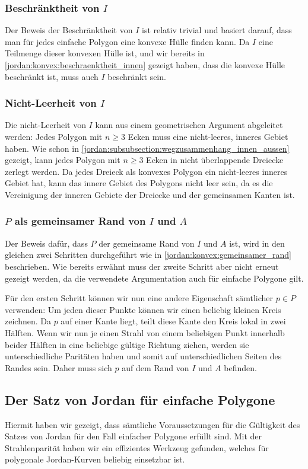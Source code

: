 \subsubsection{Beschränktheit von $I$
\label{jordan:subsubsection:beschraenktheit_innen}}

Der Beweis der Beschränktheit von $I$ ist relativ trivial und basiert darauf, dass man für jedes einfache Polygon eine konvexe Hülle finden kann.
Da $I$ eine Teilmenge dieser konvexen Hülle ist, und wir bereits in \ref{jordan:konvex:beschraenktheit_innen} gezeigt haben, dass die konvexe Hülle beschränkt ist, muss auch $I$ beschränkt sein.

\subsubsection{Nicht-Leerheit von $I$
\label{jordan:subsubsection:nicht_leerheit_innen}}

Die nicht-Leerheit von $I$ kann aus einem geometrischen Argument abgeleitet werden: Jedes Polygon mit $n \geq 3$ Ecken muss eine nicht-leeres, inneres Gebiet haben.
Wie schon in \ref{jordan:subsubsection:wegzusammenhang_innen_aussen} gezeigt, kann jedes Polygon mit $n \geq 3$ Ecken in nicht überlappende Dreiecke zerlegt werden.
Da jedes Dreieck als konvexes Polygon ein nicht-leeres inneres Gebiet hat, kann das innere Gebiet des Polygons nicht leer sein, da es die Vereinigung der inneren Gebiete der Dreiecke und der gemeinsamen Kanten ist.

\subsubsection{$P$ als gemeinsamer Rand von $I$ und $A$
\label{jordan:subsubsection:gemeinsamer_rand_innen_aussen}}

Der Beweis dafür, dass $P$ der gemeinsame Rand von $I$ und $A$ ist, wird in den gleichen zwei Schritten durchgeführt wie in \ref{jordan:konvex:gemeinsamer_rand} beschrieben.
Wie bereits erwähnt muss der zweite Schritt aber nicht erneut gezeigt werden, da die verwendete Argumentation auch für einfache Polygone gilt.

Für den ersten Schritt können wir nun eine andere Eigenschaft sämtlicher $p \in P$ verwenden:
Um jeden dieser Punkte können wir einen beliebig kleinen Kreis zeichnen.
Da $p$ auf einer Kante liegt, teilt diese Kante den Kreis lokal in zwei Hälften.
Wenn wir nun je einen Strahl von einem beliebigen Punkt innerhalb beider Hälften in eine beliebige gültige Richtung ziehen, werden sie unterschiedliche Paritäten haben und somit auf unterschiedlichen Seiten des Randes sein.
Daher muss sich $p$ auf dem Rand von $I$ und $A$ befinden.

\subsection{Der Satz von Jordan für einfache Polygone
\label{jordan:subsection:satz_von_jordan_einfache_polygone}}

Hiermit haben wir gezeigt, dass sämtliche Voraussetzungen für die Gültigkeit des Satzes von Jordan für den Fall einfacher Polygone erfüllt sind.
Mit der Strahlenparität haben wir ein effizientes Werkzeug gefunden, welches für polygonale Jordan-Kurven beliebig einsetzbar ist.
